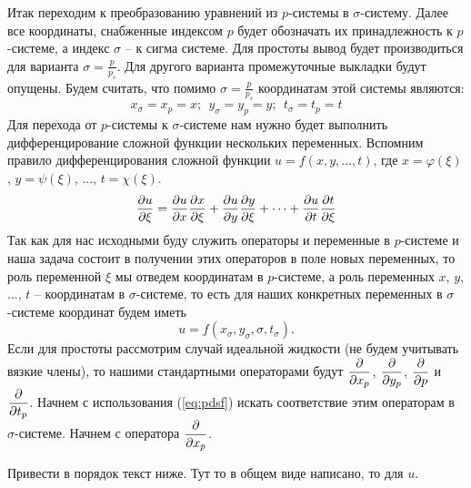 Итак переходим к преобразованию уравнений из $p$-системы в $\sigma$-систему. Далее все координаты, снабженные индексом $p$ будет обозначать их принадлежность к $p$-системе, а индекс $\sigma$ -- к сигма системе. Для простоты вывод будет производиться для варианта $\sigma=\frac{p}{p_s}$.  Для другого варианта промежуточные выкладки будут опущены. Будем считать, что помимо $\sigma=\frac{p}{p_s}$ координатам этой системы являются: 
\begin{equation}
    x_{\sigma}=x_p=x; \:\:y_{\sigma}=y_p=y; \:\:t_{\sigma}=t_p=t
\end{equation}
Для перехода от $p$-системы к $\sigma$-системе нам нужно будет выполнить дифференцирование сложной функции нескольких переменных. Вспомним правило дифференцирования сложной функции $u=f(x,y,...,t)$, где $x=\varphi(\xi)$, $y=\psi(\xi)$, ..., $t=\chi(\xi)$.
\begin{equation}
\label{eq:pdsf}
    \displaystyle\frac{\partial u}{\partial \xi}=\displaystyle\frac{\partial u}{\partial x}\displaystyle\frac{\partial x}{\partial \xi}+\displaystyle\frac{\partial u}{\partial y}\displaystyle\frac{\partial y}{\partial \xi}+\cdots+\displaystyle\frac{\partial u}{\partial t}\displaystyle\frac{\partial t}{\partial \xi}
\end{equation}
Так как для нас исходными буду служить операторы и переменные в $p$-системе и наша задача состоит в получении этих операторов в поле новых переменных, то роль переменной $\xi$ мы отведем координатам в $p$-системе, а роль переменных $x$, $y$, ..., $t$ -- координатам в $\sigma$-системе, то есть для наших конкретных переменных в $\sigma$-системе координат будем иметь
\begin{equation*}
    u=f(x_{\sigma},y_{\sigma},\sigma,t_{\sigma}).
\end{equation*}
Если для простоты рассмотрим случай идеальной жидкости (не будем учитывать вязкие члены), то нашими стандартными операторами будут $\displaystyle\frac{\partial }{\partial x_p}$, $\displaystyle\frac{\partial }{\partial y_p}$, $\displaystyle\frac{\partial }{\partial p}$ и $\displaystyle\frac{\partial }{\partial t_p}$. Начнем с использования (\ref{eq:pdsf}) искать соответствие этим операторам в $\sigma$-системе. Начнем с оператора $\displaystyle\frac{\partial }{\partial x_p}$.

\begin{warn}
    Привести в порядок текст ниже. Тут то в общем виде написано, то для $u$. 
\end{warn}


